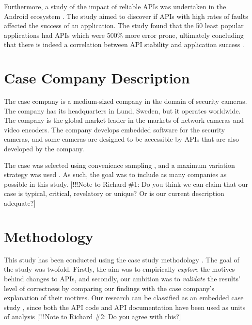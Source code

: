 \documentclass[10pt,twocolumn]{article}
\begin{document}
Furthermore, a study of the impact of reliable APIs was undertaken in the Android ecosystem \cite{mcdonnell2013empirical}. The study aimed to discover if APIs with high rates of faults affected the success of an application. The study found that the 50 least popular applications had APIs which were 500\% more error prone, ultimately concluding that there is indeed a correlation between API stability and application success \cite{mcdonnell2013empirical}. 

\section{Case Company Description}
The case company is a medium-sized company in the domain of security cameras. The company has its headquarters in Lund, Sweden, but it operates worldwide. The company is the global market leader in the markets of network cameras and video encoders. The company develops embedded software for the security cameras, and some cameras are designed to be accessible by APIs that are also developed by the company. 


The case was selected using convenience sampling \cite{flyvbjerg2006five}, and a maximum variation strategy was used \cite{benbasat1987case}. As such, the goal was to include as many companies as possible in this study. [!!!Note to Richard \#1: Do you think we can claim that our case is typical, critical, revelatory or unique? Or is our current description adequate?]



\section{Methodology}
This study has been conducted using the case study methodology \cite{runeson2009guidelines}. The goal of the study was twofold. Firstly, the aim was to empirically \textit{explore} the motives behind changes to APIs, and secondly, our ambition was to \textit{validate} the results' level of correctness by comparing our findings with the case company's explanation of their motives. Our research can be classified as an embedded case study \cite{yin2013case}, since both the API code and API documentation have been used as units of analysis [!!!Note to Richard \#2: Do you agree with this?] 
\end{document}
